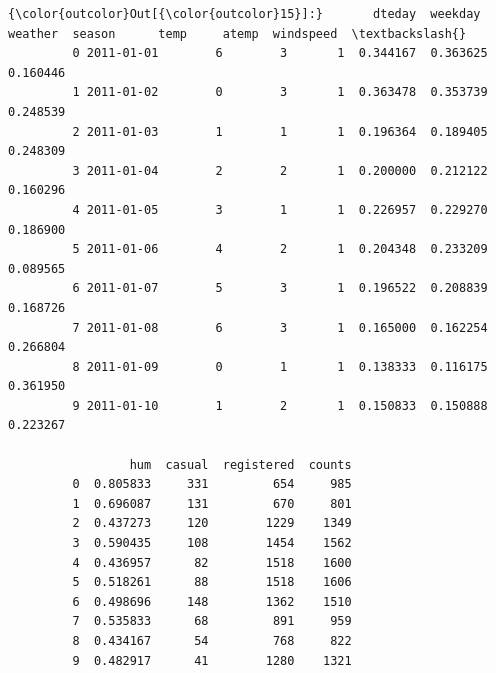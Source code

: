 \documentclass[11pt]{article}
\begin{document}
\begin{Verbatim}[commandchars=\\\{\}]
{\color{outcolor}Out[{\color{outcolor}15}]:}       dteday  weekday  weather  season      temp     atemp  windspeed  \textbackslash{}
         0 2011-01-01        6        3       1  0.344167  0.363625   0.160446   
         1 2011-01-02        0        3       1  0.363478  0.353739   0.248539   
         2 2011-01-03        1        1       1  0.196364  0.189405   0.248309   
         3 2011-01-04        2        2       1  0.200000  0.212122   0.160296   
         4 2011-01-05        3        1       1  0.226957  0.229270   0.186900   
         5 2011-01-06        4        2       1  0.204348  0.233209   0.089565   
         6 2011-01-07        5        3       1  0.196522  0.208839   0.168726   
         7 2011-01-08        6        3       1  0.165000  0.162254   0.266804   
         8 2011-01-09        0        1       1  0.138333  0.116175   0.361950   
         9 2011-01-10        1        2       1  0.150833  0.150888   0.223267   
         
                 hum  casual  registered  counts  
         0  0.805833     331         654     985  
         1  0.696087     131         670     801  
         2  0.437273     120        1229    1349  
         3  0.590435     108        1454    1562  
         4  0.436957      82        1518    1600  
         5  0.518261      88        1518    1606  
         6  0.498696     148        1362    1510  
         7  0.535833      68         891     959  
         8  0.434167      54         768     822  
         9  0.482917      41        1280    1321  
\end{Verbatim}
            
\end{document}
